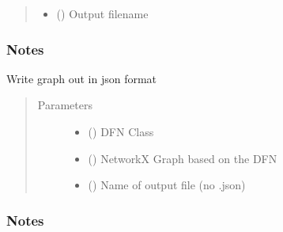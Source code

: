 \documentclass[letterpaper,10pt,english]{sphinxmanual}
\begin{document}
\begin{fulllineitems}
\begin{fulllineitems}
\begin{quote}
\begin{description}
\begin{itemize}
\item {} 
 () \textendash{} Output filename

\end{itemize}

\end{description}\end{quote}
\subsubsection*{Notes}

\end{fulllineitems}


\begin{fulllineitems}
\label{\detokenize{pydfnworks:pydfnworks.general.dfnworks.DFNWORKS.dump_json_graph}}
Write graph out in json format
\begin{quote}\begin{description}
\item[{Parameters}] \leavevmode\begin{itemize}
\item {} 
 () \textendash{} DFN Class

\item {} 
 () \textendash{} NetworkX Graph based on the DFN

\item {} 
 () \textendash{} Name of output file (no .json)

\end{itemize}

\end{description}\end{quote}
\subsubsection*{Notes}


\end{fulllineitems}
\end{fulllineitems}
\end{document}
